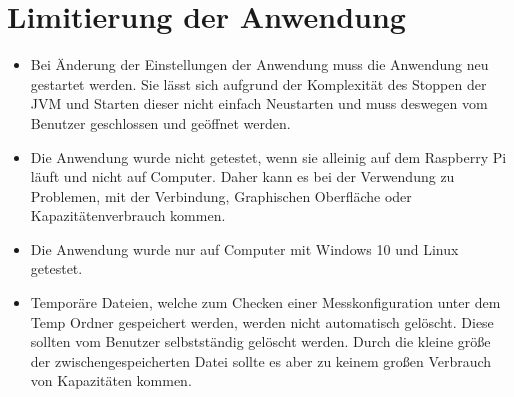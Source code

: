 \documentclass[parskip=full]{scrartcl}
\begin{document}
\clearpage

\section{Limitierung der Anwendung}

\begin{itemize}

\item Bei Änderung der Einstellungen der Anwendung muss die Anwendung neu gestartet werden. Sie lässt sich aufgrund der Komplexität des Stoppen der JVM und Starten dieser nicht einfach Neustarten und muss deswegen vom Benutzer geschlossen und geöffnet werden.

\item Die Anwendung wurde nicht getestet, wenn sie alleinig auf dem Raspberry Pi läuft und nicht auf Computer. Daher kann es bei der Verwendung zu Problemen, mit der Verbindung, Graphischen Oberfläche oder Kapazitätenverbrauch kommen.

\item Die Anwendung wurde nur auf Computer mit Windows 10 und Linux getestet.

\item Temporäre Dateien, welche zum Checken einer Messkonfiguration unter dem Temp Ordner gespeichert werden, werden nicht automatisch gelöscht. Diese sollten vom Benutzer selbstständig gelöscht werden. Durch die kleine größe der zwischengespeicherten Datei sollte es aber zu keinem großen Verbrauch von Kapazitäten kommen.

\end{itemize}

\printnoidxglossaries				%
\end{document}
